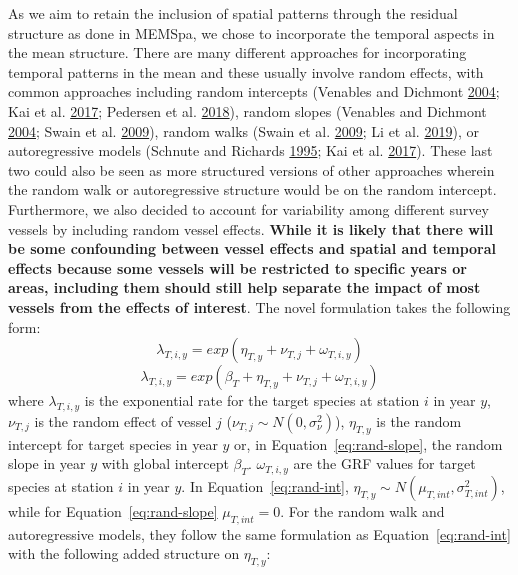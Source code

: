 \documentclass[12pt]{article}\usepackage[]{graphicx}\usepackage[]{color}
\begin{document}
As we aim to retain the inclusion of spatial patterns through the residual structure as done in MEMSpa, we chose to incorporate the temporal aspects in the mean structure. There are many different approaches for incorporating temporal patterns in the mean and these usually involve random effects, with common approaches including random intercepts (Venables and Dichmont \protect\hyperlink{ref-Venables2004}{2004}; Kai et al. \protect\hyperlink{ref-Kai2017}{2017}; Pedersen et al. \protect\hyperlink{ref-Pedersen2018}{2018}), random slopes (Venables and Dichmont \protect\hyperlink{ref-Venables2004}{2004}; Swain et al. \protect\hyperlink{ref-Swain2009}{2009}), random walks (Swain et al. \protect\hyperlink{ref-Swain2009}{2009}; Li et al. \protect\hyperlink{ref-Li2019}{2019}), or autoregressive models (Schnute and Richards \protect\hyperlink{ref-Schnute1995}{1995}; Kai et al. \protect\hyperlink{ref-Kai2017}{2017}). These last two could also be seen as more structured versions of other approaches wherein the random walk or autoregressive structure would be on the random intercept. Furthermore, we also decided to account for variability among different survey vessels by including random vessel effects. \textbf{While it is likely that there will be some confounding between vessel effects and spatial and temporal effects because some vessels will be restricted to specific years or areas, including them should still help separate the impact of most vessels from the effects of interest}. The novel formulation takes the following form:
\begin{equation}\label{eq:rand-int}
\lambda_{T,i,y} = exp(\eta_{T,y}+ \nu_{T,j}+\omega_{T,i,y})
\end{equation} \begin{equation}\label{eq:rand-slope}
\lambda_{T,i,y} = exp(\beta_T+\eta_{T,y}+ \nu_{T,j}+\omega_{T,i,y})
\end{equation}
where \(\lambda_{T,i,y}\) is the exponential rate for the target species at station \(i\) in year \(y\), \(\nu_{T,j}\) is the random effect of vessel \(j\) (\(\nu_{T,j} \sim N(0,\sigma_\nu^2)\)), \(\eta_{T,y}\) is the random intercept for target species in year \(y\) or, in Equation~\ref{eq:rand-slope}, the random slope in year \(y\) with global intercept \(\beta_T\). \(\omega_{T,i,y}\) are the GRF values for target species at station \(i\) in year \(y\). In Equation~\ref{eq:rand-int}, \(\eta_{T,y} \sim N(\mu_{T,int},\sigma_{T,int}^2)\), while for Equation~\ref{eq:rand-slope} \(\mu_{T,int}=0\). For the random walk and autoregressive models, they follow the same formulation as Equation~\ref{eq:rand-int} with the following added structure on \(\eta_{T,y}\):
\end{document}
